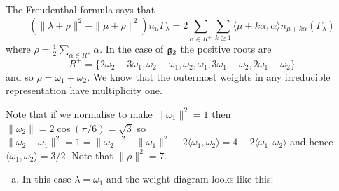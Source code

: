 \documentclass[12pt]{article}
\begin{document}
\begin{answer}
The Freudenthal formula says that
\[\left(\|\lambda+\rho\|^2-\|\mu+\rho\|^2\right)n_{\mu}\Gamma_{\lambda}=2\sum_{\alpha\in R^+}\sum_{k\geq 1}\langle\mu+k\alpha,\alpha\rangle n_{\mu+k\alpha}(\Gamma_{\lambda})\]
where $\rho=\frac{1}{2}\sum_{\alpha\in R^+}\alpha$. In the case of $\mathfrak{g}_2$ the positive roots are
\[R^+=\{2\omega_2-3\omega_1,\omega_2-\omega_1,\omega_2,\omega_1,3\omega_1-\omega_2,2\omega_1-\omega_2\}\]
and so $\rho=\omega_1+\omega_2$. We know that the outermost weights in any irreducible representation have multiplicity one.

Note that if we normalise to make $\|\omega_1\|^2=1$ then $\|\omega_2\|=2\cos(\pi/6)=\sqrt{3}$ so $\|\omega_2-\omega_1\|^2=1=\|\omega_2\|^2+\|\omega_1\|^2-2\langle\omega_1,\omega_2\rangle=4-2\langle\omega_1,\omega_2\rangle$ and hence $\langle\omega_1,\omega_2\rangle=3/2$. Note that $\|\rho\|^2=7$.
\begin{enumerate}[(a)]
\item In this case $\lambda=\omega_1$ and the weight diagram looks like this:

\gtwolambdaonezero


\end{enumerate}
\end{answer}
\end{document}
